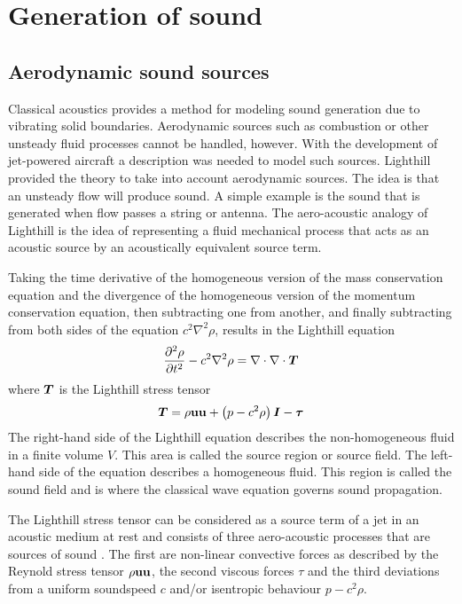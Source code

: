 \section{Generation of sound}

\subsection{Aerodynamic sound sources}\label{sec:theory:sound:aerodynamic}
Classical acoustics provides a method for modeling sound generation due to
vibrating solid boundaries. Aerodynamic sources such as combustion or other
unsteady fluid processes cannot be handled, however. With the development of
jet-powered aircraft a description was needed to model such sources. Lighthill
provided the theory to take into account aerodynamic sources. The idea is that
an unsteady flow will produce sound. A simple example is the sound that is
generated when flow passes a string or antenna.
The aero-acoustic analogy of Lighthill is the idea of representing a fluid
mechanical process that acts as an acoustic source by an acoustically equivalent
source term.


Taking the time derivative of the homogeneous version of the mass conservation
equation and the divergence of the homogeneous version of the momentum
conservation equation, then subtracting one from another, and finally
subtracting from both sides of the equation $c^2 \nabla^2 \rho$, results in the
Lighthill equation
\begin{equation}\label{eq:theory:sound:generation:lighthill}
  \frac{\partial^2 \rho}{\partial t^2} - c^2 \nabla^2 \rho = \nabla \cdot \nabla \cdot \bm{T}
\end{equation}
where $\bm{T}$ is the Lighthill stress tensor
\begin{equation}
  \bm{T} = \rho \mathbf{u}\mathbf{u} + \left( p - c^2 \rho \right) \bm{I} - \bm{\tau}
\end{equation}
The right-hand side of the Lighthill equation describes the non-homogeneous
fluid in a finite volume $V$. This area is called the source region or source
field. The left-hand side of the equation describes a homogeneous fluid. This
region is called the sound field and is where the classical wave equation
governs sound propagation.

The Lighthill stress tensor can be considered as a source term of a jet in an
acoustic medium at rest and consists of three aero-acoustic processes that are
sources of sound \cite{Rienstra2017}. The first are non-linear convective forces
as described by the Reynold stress tensor $\rho \mathbf{u}\mathbf{u}$, the second
viscous forces $\tau$ and the third deviations from a uniform soundspeed $c$
and/or isentropic behaviour $p - c^2 \rho$.


